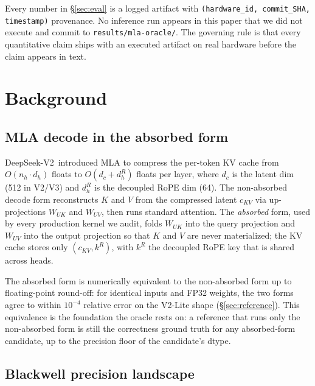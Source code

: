 \documentclass[11pt]{article}
\begin{document}
Every number in \S\ref{sec:eval} is a logged artifact with
\texttt{(hardware\_id, commit\_SHA, timestamp)} provenance. No inference
run appears in this paper that we did not execute and commit to
\texttt{results/mla-oracle/}. The governing rule is that every
quantitative claim ships with an executed artifact on real hardware
before the claim appears in text.

\section{Background}
\label{sec:background}

\subsection{MLA decode in the absorbed form}
\label{sec:background-mla}

DeepSeek-V2\,\citep{deepseekv2} introduced MLA to compress the per-token
KV cache from \(O(n_h \cdot d_h)\) floats to \(O(d_c + d_h^R)\) floats
per layer, where \(d_c\) is the latent dim (512 in V2/V3) and \(d_h^R\)
is the decoupled RoPE dim (64). The non-absorbed decode form
reconstructs \(K\) and \(V\) from the compressed latent \(c_{KV}\) via
up-projections \(W_{UK}\) and \(W_{UV}\), then runs standard attention.
The \emph{absorbed} form, used by every production kernel we audit,
folds \(W_{UK}\) into the query projection and \(W_{UV}\) into the
output projection so that \(K\) and \(V\) are never materialized; the
KV cache stores only \((c_{KV}, k^R)\), with \(k^R\) the decoupled RoPE
key that is shared across heads.

The absorbed form is numerically equivalent to the non-absorbed form up
to floating-point round-off: for identical inputs and FP32 weights, the
two forms agree to within \(10^{-4}\) relative error on the V2-Lite
shape (\S\ref{sec:reference}). This equivalence is the foundation the
oracle rests on: a reference that runs only the non-absorbed form is
still the correctness ground truth for any absorbed-form candidate, up
to the precision floor of the candidate's dtype.

\subsection{Blackwell precision landscape}
\label{sec:background-blackwell}
\end{document}
